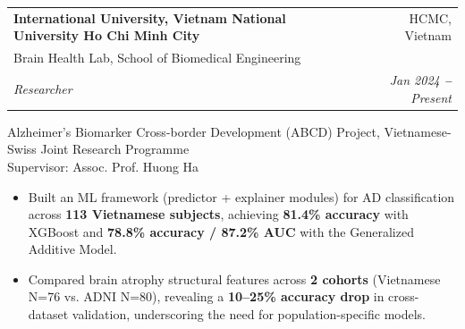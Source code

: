 \documentclass[letterpaper,11pt]{article}
\makeatletter
\newcommand{\resumeItem}[1]{
  \item\small{
    {#1 \vspace{-2pt}}
  }
}
\newcommand{\resumeSubheadingTriple}[5]{
  \vspace{-2pt}\item
    \begin{tabular*}{0.97\textwidth}[t]{l@{\extracolsep{\fill}}r}
      \textbf{#1} & #2 \\
      \small #3 & \\
      \textit{\small#4} & \textit{\small #5} \\
    \end{tabular*}\vspace{-7pt}
}
\newcommand{\resumeItemListStart}{\begin{itemize}}
\newcommand{\resumeItemListEnd}{\end{itemize}\vspace{-5pt}}
\makeatother
\begin{document}
\resumeSubheadingTriple
{International University, Vietnam National University Ho Chi Minh City}{HCMC, Vietnam}
{Brain Health Lab, School of Biomedical Engineering}
{Researcher}{Jan 2024 \textbf{--} Present}
\vspace{0.01em}

\small
Alzheimer's Biomarker Cross-border Development (ABCD) Project, Vietnamese-Swiss Joint Research Programme\\Supervisor: Assoc. Prof. Huong Ha
\vspace{-0.75em}
\begin{itemize}
  \item Built an ML framework (predictor + explainer modules) for AD
        classification across \textbf{113 Vietnamese subjects}, achieving \textbf{81.4\%
          accuracy} with XGBoost and \textbf{78.8\% accuracy / 87.2\% AUC} with the
        Generalized Additive Model.
  \item Compared brain atrophy structural features across \textbf{2 cohorts}
        (Vietnamese N=76 vs. ADNI N=80), revealing a \textbf{10--25\% accuracy drop}
        in cross-dataset validation, underscoring the need for population-specific models.
\end{itemize}
\normalsize
\end{document}
